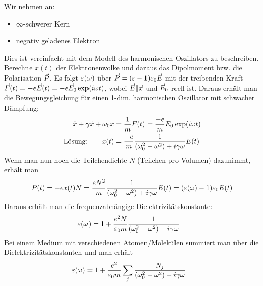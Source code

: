 Wir nehmen an:
\begin{itemize}
\item$\infty$-schwerer Kern
\item negativ geladenes Elektron
\end{itemize}
Dies ist vereinfacht mit dem Modell des harmonischen Oszillators zu
beschreiben. Berechne $x(t)$ der Elektronenwolke und daraus das
Dipolmoment bzw. die Polarisation $\vec{P}$. Es folgt $\varepsilon(\omega)$
über $\vec{P}=(\varepsilon-1)\varepsilon_0 \vec{E}$ mit der treibenden Kraft
$\vec{F}(t)=-e\vec{E}(t)=-e\vec{E}_0 \exp(i\omega t)$, wobei $\vec{E}\|\vec{x}$
und $\vec{E}_0$ reell ist. 
Daraus erhält man die Bewegungsgleichung für einen 1-dim. harmonischen
Oszillator mit schwacher Dämpfung:
\begin{align*}
  \ddot{x}+\gamma\dot{x}+\omega_0 x
  &=\frac{1}{m} F(t)
    =\frac{-e}{m}E_0\exp(i\omega t)\\
  \text{Lösung:}\qquad 
  x(t)
  &=\frac{-e}{m}\frac{1}{(\omega_0^2-\omega^2)+i\gamma\omega}E(t)
\end{align*}
Wenn man nun noch die Teilchendichte $N$ (Teilchen pro Volumen)
dazunimmt, erhält man
\begin{align*}
  P(t) &= -ex(t)N
         = \frac{eN^2}{m} 
         \frac{1}{(\omega_0^2-\omega^2) + i\gamma\omega} E(t)
         =(\varepsilon(\omega)-1)\varepsilon_0 E(t)\\
\end{align*}
Daraus erhält man die frequenzabhängige Dielektrizitätskonstante: 
\begin{align*}
  \varepsilon(\omega) &= 1 + \frac{e^2N}{\varepsilon_0 m}
                 \frac{1}{(\omega_0^2 - \omega^2) + i\gamma\omega}
\end{align*}
Bei einem Medium mit verschiedenen Atomen/Molekülen summiert man über
die Dielektrizitätskonstanten und man erhält
\begin{align*}
  \varepsilon(\omega) &= 1 + \frac{e^2}{\varepsilon_0 m}
                 \sum_{j} \frac{N_j}{(\omega_0^2-\omega^2)+i\gamma\omega}
\end{align*}

